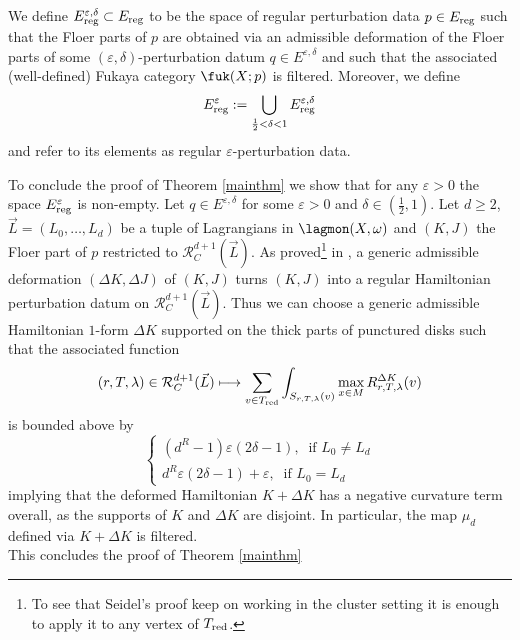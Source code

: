 	\begin{dfn}\label{transversalityepsilon}
		We define $E^{\varepsilon,\delta}_\textnormal{reg}\subset E_\textnormal{reg}$ to be the space of regular perturbation data $p\in E_\textnormal{reg}$ such that the Floer parts of $p$ are obtained via an admissible deformation of the Floer parts of some $(\varepsilon,\delta)$-perturbation datum $q\in E^{\varepsilon,\delta}$ and such that the associated (well-defined) Fukaya category $\fuk(X;p)$ is filtered. Moreover, we define $$E^\varepsilon_\textnormal{reg}:=\bigcup_{\frac{1}{2}<\delta<1} E^{\varepsilon,\delta}_\textnormal{reg}$$ and refer to its elements as regular $\varepsilon$-perturbation data.
	\end{dfn}
	
	\noindent To conclude the proof of Theorem \ref{mainthm} we show that for any $\varepsilon>0$ the space $E^\varepsilon_\textnormal{reg}$ is non-empty. Let $q\in E^{\varepsilon,\delta}$ for some $\varepsilon>0$ and $\delta\in \left(\frac{1}{2},1\right)$. Let $d\geq 2$, $\vec{L}=(L_0,\ldots, L_d)$ be a tuple of Lagrangians in $\lagmon(X,\omega)$ and $(K, J)$ the Floer part of $p$ restricted to $\mathcal{R}^{d+1}_C(\vec{L})$. As proved\footnote{To see that Seidel's proof keep on working in the cluster setting it is enough to apply it to any vertex of $T_\textnormal{red}$.} in \cite[Chapter 9k]{Se:book-fukaya-categ}, a generic admissible deformation $(\Delta K, \Delta J)$ of $(K, J)$ turns $(K, J)$ into a regular Hamiltonian perturbation datum on $\mathcal{R}^{d+1}_C(\vec{L})$. Thus we can choose a generic admissible Hamiltonian $1$-form $\Delta K$ supported on the thick parts of punctured disks such that the associated function $$(r,T,\lambda)\in \mathcal{R}^{d+1}_C(\vec{L})\longmapsto \sum_{v\in T_{\textnormal{red}}}\int_{S_{r,T,\lambda}(v)}\max_{x\in M}R^{\Delta K}_{r,T,\lambda}(v)$$ is bounded above by $$\begin{cases}
		(d^R-1)\varepsilon(2\delta-1), \ \text{ if } L_0\neq L_d\\
		d^R\varepsilon(2\delta-1)+\varepsilon, \ \text{ if } L_0= L_d
	\end{cases}$$ implying that the deformed Hamiltonian $K+\Delta K$ has a negative curvature term overall, as the supports of $K$ and $\Delta K$ are disjoint. In particular, the map $\mu_d$ defined via $K+\Delta K$ is filtered.\\
	This concludes the proof of Theorem \ref{mainthm}
	
